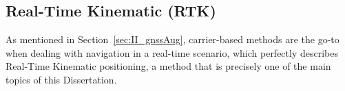 


\subsection{Real-Time Kinematic (RTK)}\label{sec:II_gnssAug_rtk}


As mentioned in Section~\ref{sec:II_gnssAug}, carrier-based methods are the go-to when dealing with navigation in a real-time scenario, which perfectly describes Real-Time Kinematic positioning, a method that is precisely one of the main topics of this Dissertation.

